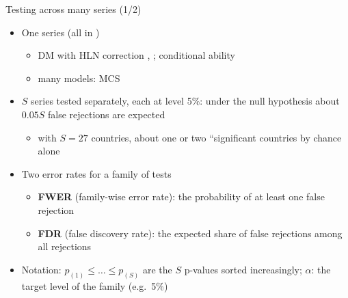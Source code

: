 \begin{frame}{Testing across many series (1/2)}
\itemsize{\small}
\begin{itemize}
    \item One series (all in )
    \begin{itemize}
        \item DM with HLN correction , ; conditional ability 
        \item many models: MCS 
    \end{itemize}
    \item $S$ series tested separately, each at level 5\%: under the null hypothesis about $0.05S$ false rejections are expected
    \begin{itemize}
        \item with $S = 27$ countries, about one or two ``significant countries by chance alone
    \end{itemize}
    \item Two error rates for a family of tests
    \begin{itemize}
        \item \textbf{FWER} (family-wise error rate): the probability of at least one false rejection
        \item \textbf{FDR} (false discovery rate): the expected share of false rejections among all rejections
    \end{itemize}
    \item Notation: $p_{(1)} \le \dots \le p_{(S)}$ are the $S$ p-values sorted increasingly; $\alpha$: the target level of the family (e.g.\ 5\%)
\end{itemize}
\end{frame}

